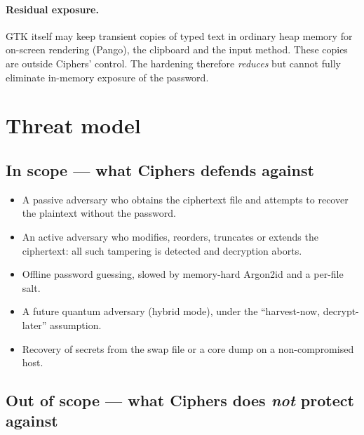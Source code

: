 \documentclass[11pt,a4paper]{article}
\begin{document}
\paragraph{Residual exposure.} GTK itself may keep transient copies of typed
text in ordinary heap memory for on-screen rendering (Pango), the clipboard
and the input method. These copies are outside Ciphers' control. The
hardening therefore \emph{reduces} but cannot fully eliminate in-memory
exposure of the password.

\section{Threat model}

\subsection{In scope — what Ciphers defends against}

\begin{itemize}[leftmargin=1.4em]
  \item A passive adversary who obtains the ciphertext file and attempts to
        recover the plaintext without the password.
  \item An active adversary who modifies, reorders, truncates or extends the
        ciphertext: all such tampering is detected and decryption aborts.
  \item Offline password guessing, slowed by memory-hard Argon2id and a
        per-file salt.
  \item A future quantum adversary (hybrid mode), under the
        ``harvest-now, decrypt-later'' assumption.
  \item Recovery of secrets from the swap file or a core dump on a
        non-compromised host.
\end{itemize}

\subsection{Out of scope — what Ciphers does \emph{not} protect against}
\end{document}
